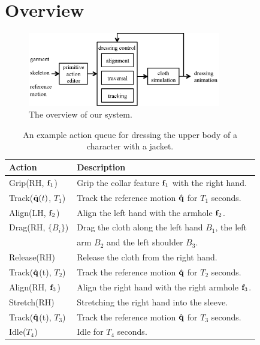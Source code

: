 \section{Overview}

\begin{figure}
  \centering
  \includegraphics[width=3.3in]{images/overview}
  \caption{The overview of our system.}
  \label{fig:overview}
\end{figure}

\begin{table}
  \centering
  \begin{tabular}{|l|l|}
    \hline
    Action & Description \\
    \hline
    Grip(RH, $\mathbf{f}_{1}$) & Grip the collar feature $\mathbf{f}_1$  with the right hand.\\
    Track($\hat{\mathbf{q}}(t)$, $T_1$) & Track the reference motion $\hat{\mathbf{q}}$ for $T_1$ seconds.\\
    Align(LH, $\mathbf{f}_{2}$) & Align the left hand with the armhole $\mathbf{f}_2$.\\
    Drag(RH, $\{B_i\}$) & Drag the cloth along the left hand $B_1$, the left\\
    &                      arm $B_2$ and the left shoulder $B_3$.\\
    Release(RH) & Release the cloth from the right hand.\\
    Track($\hat{\mathbf{q}}$(t), $T_2$) & Track the reference motion $\hat{\mathbf{q}}$ for $T_2$ seconds.\\
    Align(RH, $\mathbf{f}_{3}$) & Align the right hand with the right armhole $\mathbf{f}_3$.\\
    Stretch(RH) & Stretching the right hand into the sleeve.\\
    Track($\hat{\mathbf{q}}$(t), $T_3$) & Track the reference motion $\hat{\mathbf{q}}$ for $T_3$ seconds. \\
    Idle($T_4$) & Idle for $T_4$ seconds.\\
    \hline
  \end{tabular}
  \caption{An example action queue for dressing the upper body of a character with a jacket.}
  \label{table:actionQueue}
\end{table}


